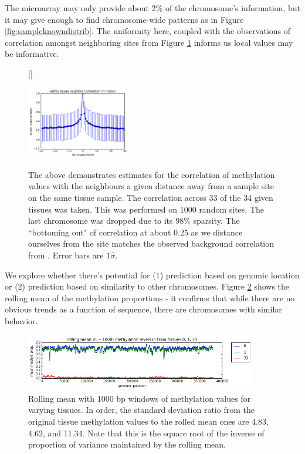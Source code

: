 \documentclass{article} %
\begin{document}
The microarray may only provide about 2\% of the chromosome's information, but it may give enough to find chromosome-wide patterns as in Figure \ref{fig:sampleknowndistrib}. The uniformity here, coupled with the observations of correlation amongst neighboring sites from Figure \ref{fig:colocalsite} informs us local values may be informative.

\begin{figure}[H]
    \centering
{}[\FBwidth]
{\caption{The above demonstrates estimates for the correlation of methylation values with the neighbours a given distance away from a sample site on the same tissue sample. The correlation across 33 of the 34 given tissues was taken. This was performed on 1000 random sites. The last chromosome was dropped due to its 98\% sparsity. The ``bottoming out" of correlation at about 0.25 as we distance ourselves from the site matches the observed background correlation from \cite{zhang2015predicting}. Error bars are $1\hat{\sigma}$.}
    \label{fig:colocalsite}}
{\includegraphics[width=0.4\textwidth]{colocalisitecorr.png}}
\end{figure}

We explore whether there's potential for (1) prediction based on genomic location or (2) prediction based on similarity to other chromosomes. Figure \ref{fig:genomictrends} shows the rolling mean of the methylation proportions - it confirms that while there are no obvious trends as a function of sequence, there are chromosomes with similar behavior.

\begin{figure}[H]
    \centering
    \includegraphics[width=0.9\textwidth]{genomictrends.png}
    \caption{Rolling mean with 1000 bp windows of methylation values for varying tissues. In order, the standard deviation ratio from the original tissue methylation values to the rolled mean ones are 4.83, 4.62, and 11.34. Note that this is the square root of the inverse of proportion of variance maintained by the rolling mean.}
    \label{fig:genomictrends}
\end{figure}
\end{document}
